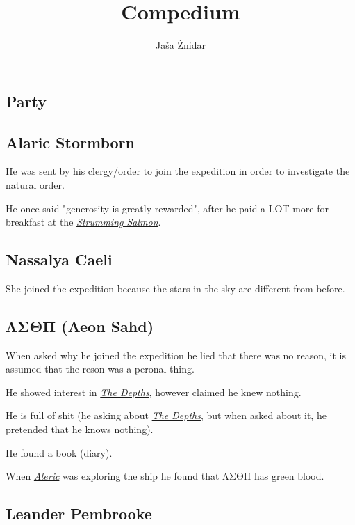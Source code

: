 \documentclass{article}
\title{Compedium}
\author{Jaša Žnidar}
\begin{document}
\maketitle

\begin{multicols}{2}

    \section{Party}
    \label{party}

    \subsection{Alaric Stormborn}
    \label{aleric}

    He was sent by his clergy/order to join the expedition in order to investigate the natural order.

    He once said "generosity is greatly rewarded", after he paid a LOT more for breakfast at the \hyperref[strumming_salmon]{\textit{Strumming Salmon}}.

    \subsection{Nassalya Caeli}
    \label{nassalya}

    She joined the expedition because the stars in the sky are different from before.


    \subsection{ΛΣΘΠ (Aeon Sahd)}
    \label{aeon}

    When asked why he joined the expedition he lied that there was no reason, it is assumed that the reson was a peronal thing.

    He showed interest in \hyperref[depths]{\textit{The Depths}}, however claimed he knew nothing.

    He is full of shit (he asking about \hyperref[depths]{\textit{The Depths}}, but when asked about it, he pretended that he knows nothing).

    He found a book (diary).

    When \hyperref[aleric]{\textit{Aleric}} was exploring the ship he found that ΛΣΘΠ has green blood.

    \subsection{Leander Pembrooke}
    \label{leander}


\end{multicols}
\end{document}
